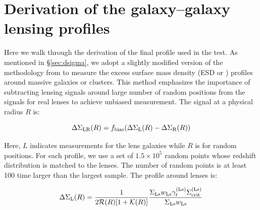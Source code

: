 \documentclass[fleqn,usenatbib,useAMS,english]{mnras}
\begin{document}




\appendix

\section{Derivation of the galaxy--galaxy lensing profiles}
    \label{app:dsigma_detail}

    Here we walk through the derivation of the final \dsigma{} profile used in the \topn{} test.
    As mentioned in \S \ref{sec:dsigma}, we adopt a slightly modified version of the methodology
    from \citet{Singh2017} to measure the excess surface mass density (ESD or \dsigma{}) profiles
    around massive galaxies or clusters.
    This method emphasizes the importance of subtracting lensing signals around large number of
    random positions from the signals for real lenses to achieve unbiased measurement.
    The \dsigma{} signal at a physical radius $R$ is:

    \begin{equation}
        {\Delta\Sigma}_{\rm LR}(R) =
        f_{\rm bias}({\Delta\Sigma}_{\mathrm{L}}(R) - {\Delta\Sigma}_{\mathrm{R}}(R))
        \label{eq:ds1}
    \end{equation}

    Here, $L$ indicates measurements for the lens galaxies while $R$ is for random positions.
    For each \dsigma{} profile, we use a set of $1.5 \times 10^5$ random points whose redshift
    distribution is matched to the lenses.
    The number of random points is at least 100 time larger than the largest \topn{} sample.
    The \dsigma{} profile around lenses is:

    \begin{equation}
        {\Delta\Sigma}_{\rm L}(R) = \frac{1}{2 \mathcal{R}(R) [1+\mathcal{K}(R)]}
            \frac{\Sigma_{\rm Ls} w_{\rm Ls} \gamma_{t}^{(\rm Ls)}
            \Sigma_{\rm crit}^{(\rm Ls)}}{\Sigma_{\rm Ls} w_{\rm Ls}}
        \label{eq:ds2}
    \end{equation}
\end{document}
